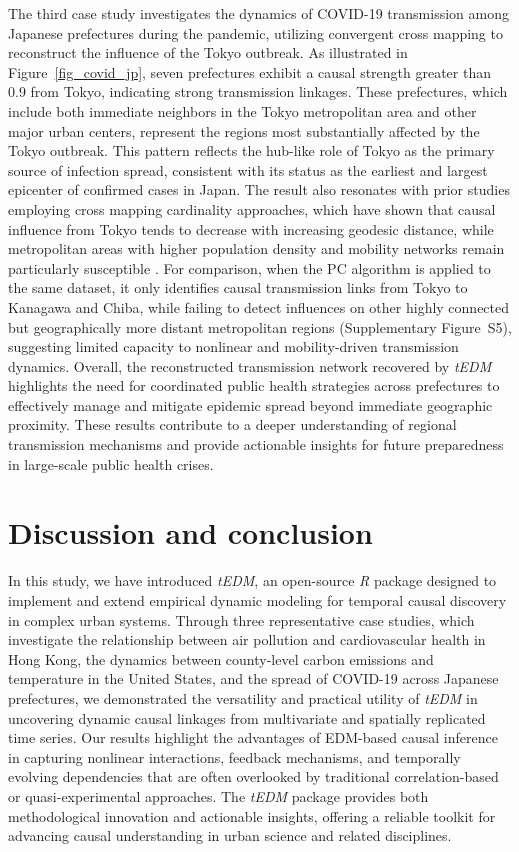 \documentclass[authoryear,preprint,review,12pt]{elsarticle}
\begin{document}
The third case study investigates the dynamics of COVID-19 transmission among Japanese prefectures during the pandemic, utilizing convergent cross mapping to reconstruct the influence of the Tokyo outbreak. As illustrated in Figure~\ref{fig_covid_jp}, seven prefectures exhibit a causal strength greater than 0.9 from Tokyo, indicating strong transmission linkages. These prefectures, which include both immediate neighbors in the Tokyo metropolitan area and other major urban centers, represent the regions most substantially affected by the Tokyo outbreak. This pattern reflects the hub-like role of Tokyo as the primary source of infection spread, consistent with its status as the earliest and largest epicenter of confirmed cases in Japan. The result also resonates with prior studies employing cross mapping cardinality approaches, which have shown that causal influence from Tokyo tends to decrease with increasing geodesic distance, while metropolitan areas with higher population density and mobility networks remain particularly susceptible \citep{tao2023cmc}. For comparison, when the PC algorithm is applied to the same dataset, it only identifies causal transmission links from Tokyo to Kanagawa and Chiba, while failing to detect influences on other highly connected but geographically more distant metropolitan regions (Supplementary Figure~S5), suggesting limited capacity to nonlinear and mobility-driven transmission dynamics. Overall, the reconstructed transmission network recovered by \textit{tEDM} highlights the need for coordinated public health strategies across prefectures to effectively manage and mitigate epidemic spread beyond immediate geographic proximity. These results contribute to a deeper understanding of regional transmission mechanisms and provide actionable insights for future preparedness in large-scale public health crises.

\section{Discussion and conclusion}\label{sec_conc}

In this study, we have introduced \textit{tEDM}, an open-source \textit{R} package designed to implement and extend empirical dynamic modeling for temporal causal discovery in complex urban systems. Through three representative case studies, which investigate the relationship between air pollution and cardiovascular health in Hong Kong, the dynamics between county-level carbon emissions and temperature in the United States, and the spread of COVID-19 across Japanese prefectures, we demonstrated the versatility and practical utility of \textit{tEDM} in uncovering dynamic causal linkages from multivariate and spatially replicated time series. Our results highlight the advantages of EDM-based causal inference in capturing nonlinear interactions, feedback mechanisms, and temporally evolving dependencies that are often overlooked by traditional correlation-based or quasi-experimental approaches. The \textit{tEDM} package provides both methodological innovation and actionable insights, offering a reliable toolkit for advancing causal understanding in urban science and related disciplines.
\end{document}
